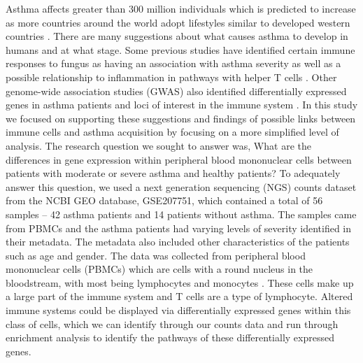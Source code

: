 \documentclass[pdflatex,sn-mathphys]{sn-jnl}%
\theoremstyle{thmstyleone}%
\theoremstyle{thmstyletwo}%
\theoremstyle{thmstylethree}%
\begin{document}
Asthma affects greater than 300 million individuals which is predicted to increase as more countries around the world adopt lifestyles similar to developed western countries \cite{Holgate2015-oz}. There are many suggestions about what causes asthma to develop in humans and at what stage. Some previous studies have identified certain immune responses to fungus as having an association with asthma severity as well as a possible relationship to inflammation in pathways with helper T cells \cite{Denning2006-jd, Holgate2012-et}. Other genome-wide association studies (GWAS) also identified differentially expressed genes in asthma patients and loci of interest in the immune system \cite{Cao2022-im, Zhu2018-zh}. In this study we focused on supporting these suggestions and findings of possible links between immune cells and asthma acquisition by focusing on a more simplified level of analysis. The research question we sought to answer was, What are the differences in gene expression within peripheral blood mononuclear cells between patients with moderate or severe asthma and healthy patients? To adequately answer this question, we used a next generation sequencing (NGS) counts dataset from the NCBI GEO database, GSE207751, which contained a total of 56 samples – 42 asthma patients and 14 patients without asthma. The samples came from PBMCs and the asthma patients had varying levels of severity identified in their metadata. The metadata also included other characteristics of the patients such as age and gender. The data was collected from peripheral blood mononuclear cells (PBMCs) which are cells with a round nucleus in the bloodstream, with most being lymphocytes and monocytes \cite{Pourahmad2015-dw}. These cells make up a large part of the immune system and T cells are a type of lymphocyte. Altered immune systems could be displayed via differentially expressed genes within this class of cells, which we can identify through our counts data and run through enrichment analysis to identify the pathways of these differentially expressed genes.
\end{document}
